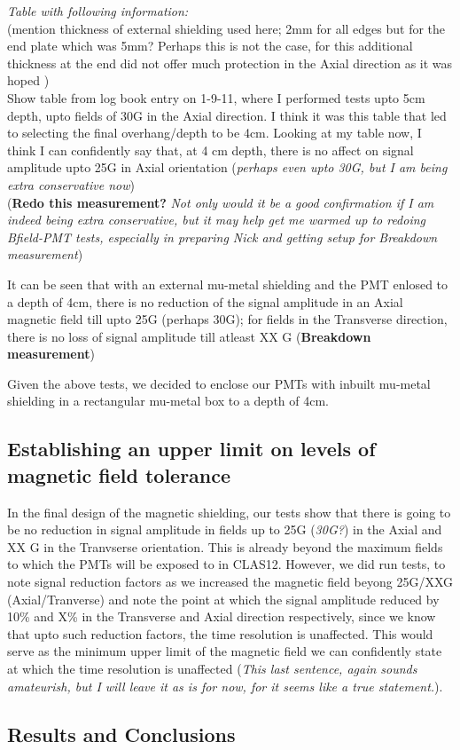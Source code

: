 \documentclass[12pt]{article}
\begin{document}
\textit{Table with following information:}\\
(mention thickness of external shielding used here; 2mm for all edges but for the end plate which was 5mm? Perhaps this is not the case, for this additional thickness at the end did not offer much protection in the Axial direction as it was hoped \cite{Steinman}) \\
Show table from log book entry on 1-9-11, where I performed tests upto 5cm depth, upto fields of 30G in the Axial direction. I think it was this table that led to selecting the final overhang/depth to be 4cm. Looking at my table now, I think I can confidently say that, at 4 cm depth, there is no affect on signal amplitude upto 25G in Axial orientation (\textit{perhaps even upto 30G, but I am being extra conservative now})\\
 (\textbf{Redo this measurement?} \textit{Not only would it be a good confirmation if I am indeed being extra conservative, but it may help get me warmed up to redoing Bfield-PMT tests, especially in preparing Nick and getting setup for Breakdown measurement})

 It can be seen that with an external mu-metal shielding and the PMT enlosed to a depth of 4cm, there is no reduction of the signal amplitude in an Axial magnetic field till upto 25G (perhaps 30G); for fields in the Transverse direction, there is no loss of signal amplitude till atleast XX G (\textbf{Breakdown measurement})

 Given the above tests, we decided to enclose our PMTs with inbuilt mu-metal shielding in a rectangular mu-metal box to a depth of 4cm. 

 \subsection{Establishing an upper limit on levels of magnetic field tolerance}
  In the final design of the magnetic shielding, our tests show that there is going to be no reduction in signal amplitude in fields up to 25G (\textit{30G?}) in the Axial and XX G in the Tranvserse orientation. This is already beyond the maximum fields to which the PMTs will be exposed to in CLAS12. However, we did run tests, to note signal reduction factors as we increased the magnetic field beyong 25G/XXG (Axial/Tranverse) and note the point at which the signal amplitude reduced by 10\% and X\% in the Transverse and Axial direction respectively, since we know that upto such reduction factors, the time resolution is unaffected. This would serve as the minimum upper limit of the magnetic field we can confidently state at which the time resolution is unaffected (\textit{This last sentence, again sounds amateurish, but I will leave it as is for now, for it seems like a true statement.}).


\subsection{Results and Conclusions}



\label{bib}


\end{document}
